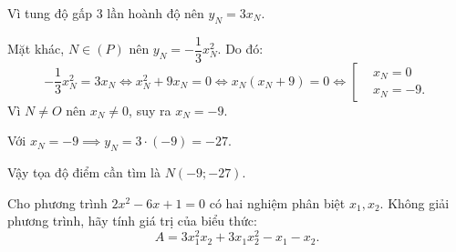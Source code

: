 \begin{bt}
{\begin{enumerate}[a)]
			Vì tung độ gấp $3$ lần hoành độ nên $y_N = 3x_N$.
			
			Mặt khác, $N \in (P)$ nên $y_N = -\dfrac{1}{3}x_N^2$. Do đó:
			$$-\dfrac{1}{3}x_N^2 = 3x_N \iff x_N^2 + 9x_N = 0 \iff x_N(x_N + 9) = 0 \iff \left[\begin{aligned} &x_N = 0 \\ &x_N = -9. \end{aligned}\right.$$
			Vì $N \neq O$ nên $x_N \neq 0$, suy ra $x_N = -9$.
			
			Với $x_N = -9 \implies y_N = 3 \cdot (-9) = -27$.
			
			Vậy tọa độ điểm cần tìm là $N(-9; -27)$.
		\end{enumerate}
	}
\end{bt}

\begin{bt}%
	Cho phương trình $2x^2 - 6x + 1 = 0$ có hai nghiệm phân biệt $x_1, x_2$. Không giải phương trình, hãy tính giá trị của biểu thức:
	$$A = 3x_1^2 x_2 + 3x_1 x_2^2 - x_1 - x_2.$$
\end{bt}

